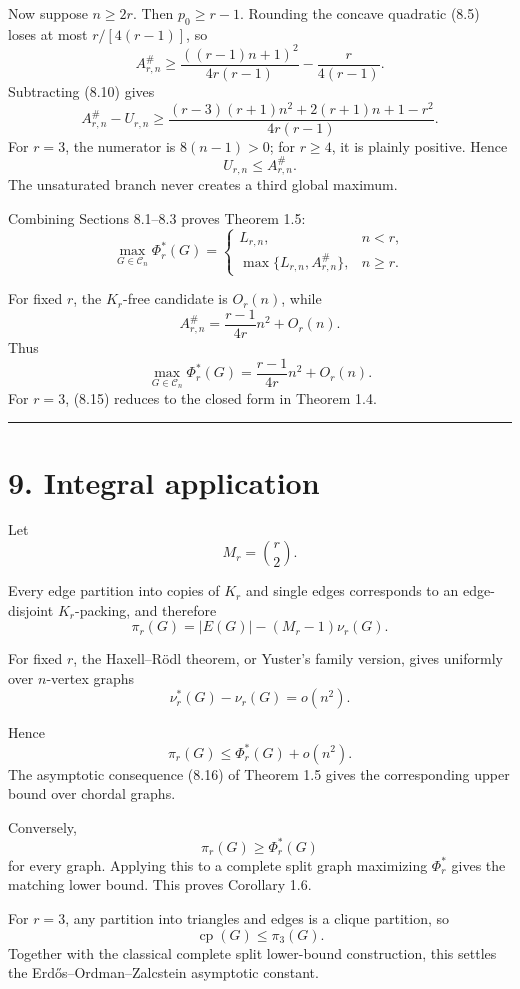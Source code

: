 \documentclass[11pt,a4paper]{article}
\begin{document}
Now suppose \(n\ge2r\). Then \(p_0\ge r-1\). Rounding the concave
quadratic (8.5) loses at most \(r/[4(r-1)]\), so
\[
A_{r,n}^{\#}
\ge
\frac{((r-1)n+1)^2}{4r(r-1)}
-
\frac r{4(r-1)}.
\]
Subtracting (8.10) gives
\[
A_{r,n}^{\#}-U_{r,n}
\ge
\frac{(r-3)(r+1)n^2+2(r+1)n+1-r^2}{4r(r-1)}.
\tag{8.13}
\]
For \(r=3\), the numerator is \(8(n-1)>0\); for \(r\ge4\), it is plainly
positive. Hence
\[
U_{r,n}\le A_{r,n}^{\#}.
\tag{8.14}
\]
The unsaturated branch never creates a third global maximum.

Combining Sections 8.1--8.3 proves Theorem 1.5:
\[
\max_{G\in\mathcal C_n}\Phi_r^*(G)
=
\begin{cases}
L_{r,n},&n<r,\\[2mm]
\max\{L_{r,n},A_{r,n}^{\#}\},&n\ge r.
\end{cases}
\tag{8.15}
\]

For fixed \(r\), the \(K_r\)-free candidate is \(O_r(n)\), while
\[
A_{r,n}^{\#}
=
\frac{r-1}{4r}n^2+O_r(n).
\]
Thus
\[
\max_{G\in\mathcal C_n}\Phi_r^*(G)
=
\frac{r-1}{4r}n^2+O_r(n).
\tag{8.16}
\]
For \(r=3\), (8.15) reduces to the closed form in Theorem 1.4.

\begin{center}\rule{0.5\linewidth}{0.5pt}\end{center}

\section{9. Integral application}\label{integral-application-1}

Let
\[
M_r=\binom r2.
\]

Every edge partition into copies of \(K_r\) and single edges corresponds to
an edge-disjoint \(K_r\)-packing, and therefore
\[
\pi_r(G)
=
|E(G)|-(M_r-1)\nu_r(G).
\tag{9.1}
\]

For fixed \(r\), the Haxell--Rödl theorem, or Yuster's family version, gives
uniformly over \(n\)-vertex graphs
\[
\nu_r^*(G)-\nu_r(G)=o(n^2).
\tag{9.2}
\]

Hence
\[
\pi_r(G)
\le
\Phi_r^*(G)+o(n^2).
\]
The asymptotic consequence (8.16) of Theorem 1.5 gives the corresponding upper bound over chordal graphs.

Conversely,
\[
\pi_r(G)\ge\Phi_r^*(G)
\]
for every graph. Applying this to a complete split graph maximizing
\(\Phi_r^*\) gives the matching lower bound. This proves Corollary 1.6.

For \(r=3\), any partition into triangles and edges is a clique partition,
so
\[
\operatorname{cp}(G)\le\pi_3(G).
\]
Together with the classical complete split lower-bound construction, this
settles the Erdős--Ordman--Zalcstein asymptotic constant.
\end{document}
